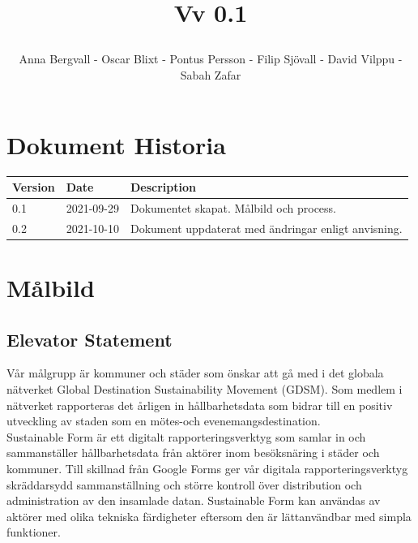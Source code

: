 \documentclass[12pt]{article}
\date {#1}
\title {
    \documentNumber {01}    

    \documentTitle {Helsingborg Event and Convention Bureau}
    
    \documentDate {2021-09-29}
    \documentVersion Vv 0.1
    
    \author{Anna Bergvall - Oscar Blixt - Pontus Persson - Filip Sjövall - David Vilppu - Sabah Zafar}
}
\begin{document}
\maketitle

\thispagestyle{empty}



\newpage

\tableofcontents


\newpage

\section{Dokument Historia}
\begin{tabular}{ l | l | l }
    Version & Date & Description \\
    \hline
    0.1 & 2021-09-29 & Dokumentet skapat. Målbild och process. \\
    \hline
    0.2 & 2021-10-10 & Dokument uppdaterat med ändringar enligt anvisning. \\
    \hline
   
\end{tabular}

\newpage

\section{Målbild}
\subsection{Elevator Statement}


Vår målgrupp är kommuner och städer som önskar att gå med i det globala nätverket Global
Destination Sustainability Movement (GDSM). Som medlem i nätverket rapporteras det
årligen in hållbarhetsdata som bidrar till en positiv utveckling av staden som en mötes-och
evenemangsdestination. \\ \indent Sustainable Form är ett digitalt rapporteringsverktyg som samlar in
och sammanställer hållbarhetsdata från aktörer inom besöksnäring i städer och kommuner.
Till skillnad från Google Forms ger vår digitala rapporteringsverktyg skräddarsydd
sammanställning och större kontroll över distribution och administration av den insamlade
datan. Sustainable Form kan användas av aktörer med olika tekniska färdigheter eftersom den
är lättanvändbar med simpla funktioner.
\end{document}

